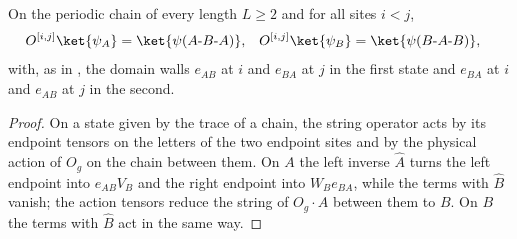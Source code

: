 \begin{lemma}
    \label{thm:mpug_domain_wall_string_creation}
    \leanok
    On the periodic chain of every length $L\geq2$ and for all sites $i<j$,
    \begin{align}
        O^{[i,j]}\ket{\psi_A}
         & =\ket{\psi(A\text{-}B\text{-}A)},
         &
        O^{[i,j]}\ket{\psi_B}
         & =\ket{\psi(B\text{-}A\text{-}B)},
        \notag
    \end{align}
    with, as in \cite[Section~III.E]{GarreRubioSchuch2024DomainWall}, the
    domain walls $e_{AB}$ at $i$ and $e_{BA}$ at $j$ in the first state and
    $e_{BA}$ at $i$ and $e_{AB}$ at $j$ in the second.
\end{lemma}

\begin{proof}\leanok
    On a state given by the trace of a chain, the string operator acts by
    its endpoint tensors on the letters of the two endpoint sites and by the
    physical action of $O_g$ on the chain between them. On $A$ the left
    inverse $\hat A$ turns the left endpoint into $e_{AB}V_B$ and the right
    endpoint into $W_Be_{BA}$, while the terms with $\hat B$ vanish; the
    action tensors reduce the string of $O_g\cdot A$ between them to $B$.
    On $B$ the terms with $\hat B$ act in the same way.
\end{proof}

